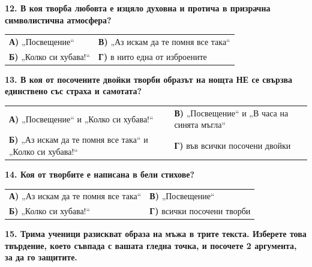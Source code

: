 \documentclass[12pt,a4paper]{article}
\begin{document}
\vspace{0.6cm}

\noindent
\textbf{12. В коя творба любовта е изцяло духовна и протича в призрачна символистична атмосфера?} \\

\vspace{-0.1cm}

\noindent
\begin{tabular}{@{}p{} p{}@{}}
\textbf{А)} „Посвещение“ & \textbf{В)} „Аз искам да те помня все така“ \\
\textbf{Б)} „Колко си хубава!“ & \textbf{Г)} в нито една от изброените
\end{tabular}

\vspace{0.6cm}

\noindent
\textbf{13. В коя от посочените двойки творби образът на нощта \textbf{НЕ} се свързва единствено със страха и самотата?} \\

\vspace{-0.1cm}

\noindent
\begin{tabular}{@{}p{} p{}@{}}
\textbf{А)} „Посвещение“ и „Колко си хубава!“ & \textbf{В)} „Посвещение“ и „В часа на синята мъгла“ \\
\textbf{Б)} „Аз искам да те помня все така“ и „Колко си хубава!“ & \textbf{Г)} във всички посочени двойки
\end{tabular}

\vspace{0.6cm}

\noindent
\textbf{14. Коя от творбите е написана в бели стихове?} \\

\vspace{-0.1cm}

\noindent
\begin{tabular}{@{}p{} p{}@{}}
\textbf{А)} „Аз искам да те помня все така“ & \textbf{В)} „Посвещение“ \\
\textbf{Б)} „Колко си хубава!“ & \textbf{Г)} всички посочени творби
\end{tabular}

\vspace{0.6cm}

\noindent
\textbf{15. Трима ученици разискват образа на мъжа в трите текста. Изберете това твърдение, което съвпада с вашата гледна точка, и посочете 2 аргумента, за да го защитите.}
\end{document}

